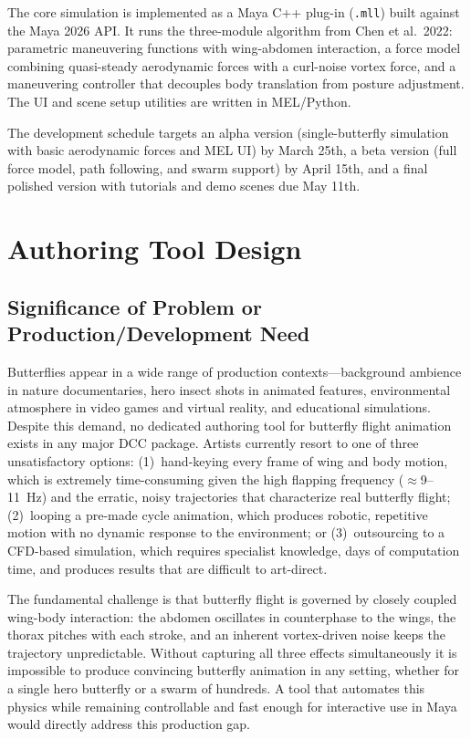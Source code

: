 \documentclass[12pt]{article}
\begin{document}
The core simulation is implemented as a Maya C++ plug-in (\texttt{.mll}) built against
the Maya 2026 API. It runs the three-module algorithm from Chen et al.\ 2022:
parametric maneuvering functions with wing-abdomen interaction, a force model combining
quasi-steady aerodynamic forces with a curl-noise vortex force, and a maneuvering
controller that decouples body translation from posture adjustment. The UI and scene
setup utilities are written in MEL/Python.

The development schedule targets an alpha version (single-butterfly simulation with
basic aerodynamic forces and MEL UI) by March 25th, a beta version (full force model,
path following, and swarm support) by April 15th, and a final polished version
with tutorials and demo scenes due May 11th.

\newpage

\section{Authoring Tool Design}

\subsection{Significance of Problem or Production/Development Need}

Butterflies appear in a wide range of production contexts---background ambience in
nature documentaries, hero insect shots in animated features, environmental
atmosphere in video games and virtual reality, and educational simulations.
Despite this demand, no dedicated authoring tool for butterfly flight animation
exists in any major DCC package. Artists currently resort to one of three
unsatisfactory options: (1)~hand-keying every frame of wing and body motion,
which is extremely time-consuming given the high flapping frequency
($\approx$9--11~Hz) and the erratic, noisy trajectories that characterize real
butterfly flight; (2)~looping a pre-made cycle animation, which produces
robotic, repetitive motion with no dynamic response to the environment; or
(3)~outsourcing to a CFD-based simulation, which requires specialist knowledge,
days of computation time, and produces results that are difficult to art-direct.

The fundamental challenge is that butterfly flight is governed by closely coupled
wing-body interaction: the abdomen oscillates in counterphase to the wings,
the thorax pitches with each stroke, and an inherent vortex-driven noise keeps
the trajectory unpredictable. Without capturing all three effects simultaneously
it is impossible to produce convincing butterfly animation in any setting, whether
for a single hero butterfly or a swarm of hundreds. A tool that automates this
physics while remaining controllable and fast enough for interactive use in Maya
would directly address this production gap.
\end{document}

